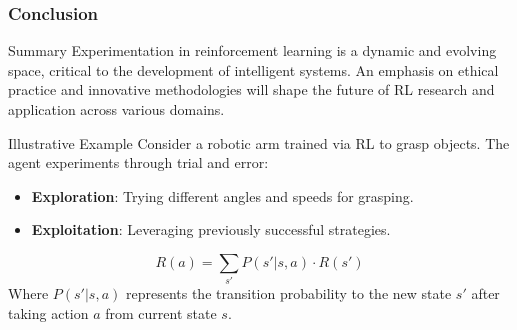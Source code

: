 \documentclass[aspectratio=169]{beamer}
\begin{document}
\begin{frame}[fragile]
  \frametitle{Conclusion}
  \begin{block}{Summary}
    Experimentation in reinforcement learning is a dynamic and evolving space, critical to the development of intelligent systems. An emphasis on ethical practice and innovative methodologies will shape the future of RL research and application across various domains.
  \end{block}

  \begin{block}{Illustrative Example}
    Consider a robotic arm trained via RL to grasp objects. The agent experiments through trial and error:
    \begin{itemize}
      \item \textbf{Exploration}: Trying different angles and speeds for grasping.
      \item \textbf{Exploitation}: Leveraging previously successful strategies.
    \end{itemize}
    
    \begin{equation}
      R(a) = \sum_{s'} P(s' | s, a) \cdot R(s')
    \end{equation}
    Where \( P(s' | s, a) \) represents the transition probability to the new state \( s' \) after taking action \( a \) from current state \( s \).
  \end{block}
\end{frame}
\end{document}
